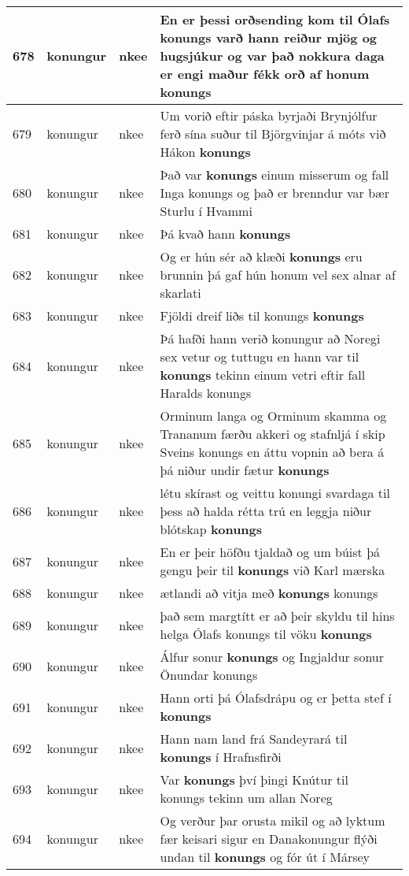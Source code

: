 \documentclass{article}
\begin{document}
\begin{longtable}{p{1cm}|p{1cm}|p{1cm}|p{13cm}}
\hline
678&konungur&nkee&En er þessi orðsending kom til Ólafs konungs varð hann reiður mjög og hugsjúkur og var það nokkura daga er engi maður fékk orð af honum \textbf{konungs} \\
\hline
679&konungur&nkee&Um vorið eftir páska byrjaði Brynjólfur ferð sína suður til Björgvinjar á móts við Hákon \textbf{konungs} \\
\hline
680&konungur&nkee&Það var \textbf{konungs} einum misserum og fall Inga konungs og það er brenndur var bær Sturlu í Hvammi\\
\hline
681&konungur&nkee&Þá kvað hann \textbf{konungs} \\
\hline
682&konungur&nkee&Og er hún sér að klæði \textbf{konungs} eru brunnin þá gaf hún honum vel sex alnar af skarlati\\
\hline
683&konungur&nkee&Fjöldi dreif liðs til konungs \textbf{konungs} \\
\hline
684&konungur&nkee&Þá hafði hann verið konungur að Noregi sex vetur og tuttugu en hann var til \textbf{konungs} tekinn einum vetri eftir fall Haralds konungs\\
\hline
685&konungur&nkee&Orminum langa og Orminum skamma og Trananum færðu akkeri og stafnljá í skip Sveins konungs en áttu vopnin að bera á þá niður undir fætur \textbf{konungs} \\
\hline
686&konungur&nkee&létu skírast og veittu konungi svardaga til þess að halda rétta trú en leggja niður blótskap \textbf{konungs} \\
\hline
687&konungur&nkee&En er þeir höfðu tjaldað og um búist þá gengu þeir til \textbf{konungs} við Karl mærska\\
\hline
688&konungur&nkee&ætlandi að vitja með \textbf{konungs} konungs\\
\hline
689&konungur&nkee&það sem margtítt er að þeir skyldu til hins helga Ólafs konungs til vöku \textbf{konungs} \\
\hline
690&konungur&nkee&Álfur sonur \textbf{konungs} og Ingjaldur sonur Önundar konungs\\
\hline
691&konungur&nkee&Hann orti þá Ólafsdrápu og er þetta stef í \textbf{konungs} \\
\hline
692&konungur&nkee&Hann nam land frá Sandeyrará til \textbf{konungs} í Hrafnsfirði\\
\hline
693&konungur&nkee&Var \textbf{konungs} því þingi Knútur til konungs tekinn um allan Noreg\\
\hline
694&konungur&nkee&Og verður þar orusta mikil og að lyktum fær keisari sigur en Danakonungur flýði undan til \textbf{konungs} og fór út í Mársey\\

\end{longtable}
\end{document}
